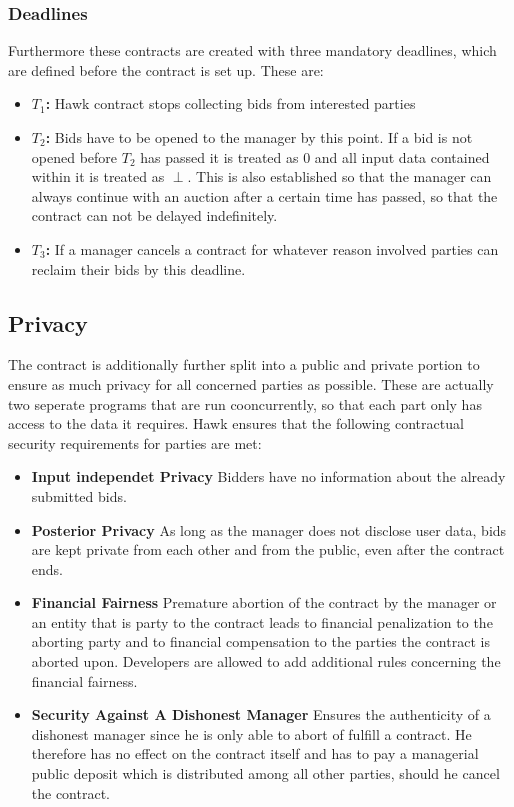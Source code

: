 \subsubsection{Deadlines}
Furthermore these contracts are created with three mandatory deadlines, which are defined before the contract is set up. These are:
\begin{itemize}
\item \textbf{$T_1$:} Hawk contract stops collecting bids from interested parties
\item \textbf{$T_2$:} Bids have to be opened to the manager by this point. If a bid is not opened before $T_2$ has passed it is treated as 0 and all input data contained within it is treated as $\perp$. This is also established so that the manager can always continue with an auction after a certain time has passed, so that the contract can not be delayed indefinitely.
\item \textbf{$T_3$:} If a manager cancels a contract for whatever reason involved parties can reclaim their bids by this deadline.
\end{itemize}

\subsection{Privacy}
The contract is additionally further split into a public and private portion to ensure as much privacy for all concerned parties as possible. These are actually two seperate programs that are run cooncurrently, so that each part only has access to the data it requires.
Hawk ensures that the following contractual security requirements for parties are met:
\begin{itemize}
\item \textbf{Input independet Privacy}
Bidders have no information about the already submitted bids.
\item \textbf{Posterior Privacy}
As long as the manager does not disclose user data, bids are kept private from each other and from the public, even after the contract ends.
\item \textbf{Financial Fairness}
Premature abortion of the contract by the manager or an entity that is party to the contract leads to financial penalization to the aborting party and to financial compensation to the parties the contract is aborted upon. Developers are allowed to add additional rules concerning the financial fairness.
\item \textbf{Security Against A Dishonest Manager}
Ensures the authenticity of a dishonest manager since he is only able to abort of fulfill a contract. He therefore has no effect on the contract itself and has to pay a managerial public deposit which is distributed among all other parties, should he cancel the contract.
\end{itemize}

